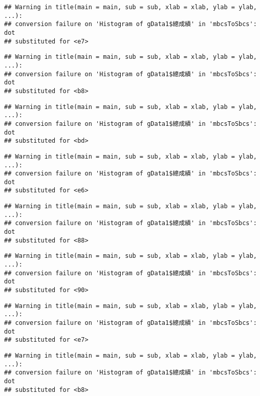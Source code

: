 \documentclass[
]{book}
\begin{document}
\begin{verbatim}
## Warning in title(main = main, sub = sub, xlab = xlab, ylab = ylab, ...):
## conversion failure on 'Histogram of gData1$總成績' in 'mbcsToSbcs': dot
## substituted for <e7>
\end{verbatim}

\begin{verbatim}
## Warning in title(main = main, sub = sub, xlab = xlab, ylab = ylab, ...):
## conversion failure on 'Histogram of gData1$總成績' in 'mbcsToSbcs': dot
## substituted for <b8>
\end{verbatim}

\begin{verbatim}
## Warning in title(main = main, sub = sub, xlab = xlab, ylab = ylab, ...):
## conversion failure on 'Histogram of gData1$總成績' in 'mbcsToSbcs': dot
## substituted for <bd>
\end{verbatim}

\begin{verbatim}
## Warning in title(main = main, sub = sub, xlab = xlab, ylab = ylab, ...):
## conversion failure on 'Histogram of gData1$總成績' in 'mbcsToSbcs': dot
## substituted for <e6>
\end{verbatim}

\begin{verbatim}
## Warning in title(main = main, sub = sub, xlab = xlab, ylab = ylab, ...):
## conversion failure on 'Histogram of gData1$總成績' in 'mbcsToSbcs': dot
## substituted for <88>
\end{verbatim}

\begin{verbatim}
## Warning in title(main = main, sub = sub, xlab = xlab, ylab = ylab, ...):
## conversion failure on 'Histogram of gData1$總成績' in 'mbcsToSbcs': dot
## substituted for <90>
\end{verbatim}

\begin{verbatim}
## Warning in title(main = main, sub = sub, xlab = xlab, ylab = ylab, ...):
## conversion failure on 'Histogram of gData1$總成績' in 'mbcsToSbcs': dot
## substituted for <e7>
\end{verbatim}

\begin{verbatim}
## Warning in title(main = main, sub = sub, xlab = xlab, ylab = ylab, ...):
## conversion failure on 'Histogram of gData1$總成績' in 'mbcsToSbcs': dot
## substituted for <b8>
\end{verbatim}
\end{document}
